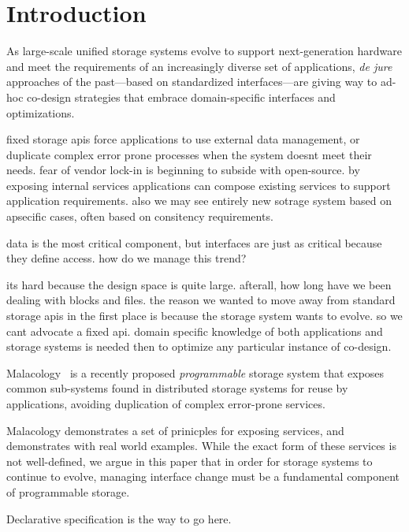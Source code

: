 \section{Introduction}
\label{sec:intro}

As large-scale unified storage systems evolve to support next-generation
hardware and meet the requirements of an increasingly diverse set of
applications, \emph{de jure} approaches of the past---based on standardized
interfaces---are giving way to ad-hoc co-design strategies that embrace
domain-specific interfaces and optimizations.
    
fixed storage apis force applications to use external data management, or
duplicate complex error prone processes when the system doesnt meet their
needs. fear of vendor lock-in is beginning to subside with open-source.  by
exposing internal services applications can compose existing services to
support application requirements.  also we may see entirely new sotrage system
based on apsecific cases, often based on consitency requirements.

data is the most critical component, but interfaces are just as critical
because they define access. how do we manage this trend?

its hard because the design space is quite large. afterall, how long have we
been dealing with blocks and files.
the reason we wanted to move away from standard storage apis in the first
place is because the storage system wants to evolve. so we cant advocate a
fixed api. domain specific knowledge of both applications and storage
systems is needed then to optimize any particular instance of co-design.

Malacology~\cite{sevilla:eurosys17} is a recently proposed \emph{programmable}
storage system that exposes common sub-systems found in distributed storage
systems for reuse by applications, avoiding duplication of complex error-prone
services.

Malacology demonstrates a set of prinicples for exposing services, and
demonstrates with real world examples. While the exact form of these services
is not well-defined, we argue in this paper that in order for storage systems
to continue to evolve, managing interface change must be a fundamental
component of programmable storage.

Declarative specification is the way to go here.

